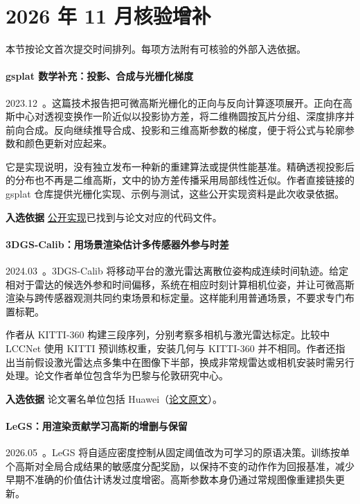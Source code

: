 \section{2026 年 11 月核验增补}

本节按论文首次提交时间排列。每项方法附有可核验的外部入选依据。

\paragraph{gsplat 数学补充：投影、合成与光栅化梯度}
2023.12~\cite{2312_02121}。这篇技术报告把可微高斯光栅化的正向与反向计算逐项展开。正向在高斯中心对透视变换作一阶近似以投影协方差，将二维椭圆按瓦片分组、深度排序并前向合成。反向继续推导合成、投影和三维高斯参数的梯度，便于将公式与轮廓参数和颜色更新对应起来。

它是实现说明，没有独立发布一种新的重建算法或提供性能基准。精确透视投影后的分布也不再是二维高斯，文中的协方差传播采用局部线性近似。作者直接链接的 gsplat 仓库提供光栅化实现、示例与测试，这些公开实现资料是此次收录依据。

\textbf{入选依据} \href{https://github.com/nerfstudio-project/gsplat}{公开实现}已找到与论文对应的代码文件。

\paragraph{3DGS-Calib：用场景渲染估计多传感器外参与时差}
2024.03~\cite{2403_11577}。3DGS-Calib 将移动平台的激光雷达离散位姿构成连续时间轨迹。给定相对于雷达的候选外参和时间偏移，系统在相应时刻计算相机位姿，并让可微高斯渲染与跨传感器观测共同约束场景和标定量。这样能利用普通场景，不要求专门布置标靶。

作者从 KITTI-360 构建三段序列，分别考察多相机与激光雷达标定。比较中 LCCNet 使用 KITTI 预训练权重，安装几何与 KITTI-360 并不相同。作者还指出当前假设激光雷达点多集中在图像下半部，换成非常规雷达或相机安装时需另行处理。论文作者单位包含华为巴黎与伦敦研究中心。

\textbf{入选依据} 论文署名单位包括 Huawei（\href{https://arxiv.org/abs/2403.11577}{论文原文}）。

\paragraph{LeGS：用渲染贡献学习高斯的增删与保留}
2026.05~\cite{2605_00408}。LeGS 将自适应密度控制从固定阈值改为可学习的原语决策。训练按单个高斯对全局合成结果的敏感度分配奖励，以保持不变的动作作为回报基准，减少早期不准确的价值估计诱发过度增密。高斯参数本身仍通过常规图像重建损失更新。

